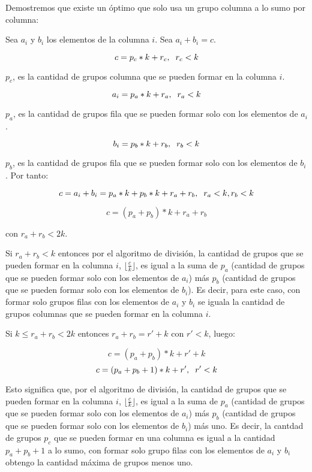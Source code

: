 \documentclass[article]{llncs}
\begin{document}
Demostremos que existe un \'optimo que solo usa un grupo columna a lo sumo 
por columna:

Sea $a_i$ y $b_i$ los elementos de la columna $i$. Sea $a_i + b_i = c$.

$$c = p_c * k + r_c, \hspace{0,2cm} r_c < k$$

$p_c$, es la cantidad de grupos columna que se pueden formar en la columna $i$.

$$a_i = p_a * k + r_a, \hspace{0,2cm} r_a < k$$

$p_a$, es la cantidad de grupos fila que se pueden formar solo con los elementos de $a_i$.

$$b_i = p_b * k + r_b, \hspace{0,2cm} r_b < k$$

$p_b$, es la cantidad de grupos fila que se pueden formar solo con los elementos de $b_i$. Por tanto:

$$c = a_i + b_i = p_a * k + p_b * k + r_a + r_b, \hspace{0,2cm} r_a < k, r_b < k$$

$$c = (p_a + p_b)*k + r_a + r_b$$

con $r_a + r_b < 2k$.

Si $r_a + r_b < k$ entonces por el algoritmo de divisi\'on, la cantidad de grupos que 
se pueden formar en la columna $i$, $\lfloor\frac{c}{k}\rfloor$, es igual a la suma 
de $p_a$ (cantidad de grupos que se pueden formar solo con los elementos de $a_i$) m\'as 
$p_b$ (cantidad de grupos que se pueden formar solo con los elementos de $b_i$). Es decir, para este caso,
con formar solo grupos filas con los elementos de $a_i$ y $b_i$ se iguala la cantidad 
de grupos columnas que se pueden formar en la columna $i$. 

Si $k \leq r_a + r_b < 2k$ entonces $r_a + r_b = r' + k$ con $r' < k$, luego:

$$c = (p_a + p_b)*k + r' + k$$
$$c = (p_a + p_b + 1)*k + r', \hspace{0,2cm} r' < k$$

Esto significa que, por el algoritmo de divisi\'on, la cantidad de grupos que 
se pueden formar en la columna $i$, $\lfloor\frac{c}{k}\rfloor$, es igual a la suma 
de $p_a$ (cantidad de grupos que se pueden formar solo con los elementos de $a_i$) m\'as 
$p_b$ (cantidad de grupos que se pueden formar solo con los elementos de $b_i$) m\'as uno. 
Es decir, la cantdad de grupos $p_c$ que se pueden formar en una columna es igual a la cantidad $p_a + p_b + 1$ 
a lo sumo, con formar solo grupo filas con los elementos de $a_i$ y $b_i$
obtengo la cantidad m\'axima de grupos menos uno.
\end{document}
